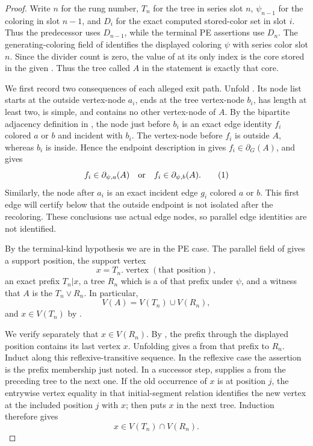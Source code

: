 \begin{proof}
Write $n$ for the rung number, $T_n$ for the tree in series slot $n$,
$\psi_{n-1}$ for the coloring in slot $n-1$, and $D_i$ for the exact
computed stored-color set in slot $i$.  Thus the predecessor uses
$D_{n-1}$, while the terminal PE assertions use $D_n$.  The
generating-coloring field of  identifies
the displayed coloring $\psi$ with series color slot $n$.  Since
the divider count is zero, the value of
 at its only index is the core stored in
the given .  Thus the tree called $A$ in the
statement is exactly that core.

We first record two consequences of each alleged exit path.  Unfold
.  Its node list starts at the outside vertex-node
$a_i$, ends at the tree vertex-node $b_i$, has length at least two, is
simple, and contains no other vertex-node of $A$.  By the bipartite
adjacency definition in , the node just
before $b_i$ is an exact edge identity $f_i$ colored $a$ or $b$ and
incident with $b_i$.  The vertex-node before $f_i$ is outside $A$,
whereas $b_i$ is inside.  Hence the endpoint description in
 gives $f_i\in\partial_G(A)$, and
 gives
\[
 f_i\in\partial_{\psi,a}(A)\quad\hbox{or}\quad
 f_i\in\partial_{\psi,b}(A).                         \tag{1}
\]
Similarly, the node after $a_i$ is an exact incident edge $g_i$ colored
$a$ or $b$.  This first edge will certify below that the outside endpoint
is not isolated after the recoloring.  These conclusions use actual edge
nodes, so parallel edge identities are not identified.

By the terminal-kind hypothesis we are in the PE case.
The parallel field of  gives a support position,
the support vertex
\[
                 x=T_n.\operatorname{vertex}(\text{that position}),
\]
an exact prefix $T_n|x$, a tree $R_n$ which is a
 of that prefix under $\psi$, and a witness
that $A$ is the  $T_n\vee R_n$.  In
particular,
\[
 V(A)=V(T_n)\cup V(R_n),                              \tag{5}
\]
and $x\in V(T_n)$ by .

We verify separately that $x\in V(R_n)$.  By
, the prefix through the displayed position
contains its last vertex $x$.  Unfolding 
gives a  from that prefix to
$R_n$.  Induct along this reflexive-transitive sequence.  In the
reflexive case the assertion is the prefix membership just noted.  In a
successor step,  supplies a
 from the preceding tree to the next
one.  If the old occurrence of $x$ is at position $j$, the entrywise
vertex equality in that initial-segment relation identifies the new
vertex at the included position $j$ with $x$; then
 puts $x$ in the next tree.  Induction
therefore gives
\[
                     x\in V(T_n)\cap V(R_n).          \tag{6}
\]


\end{proof}
